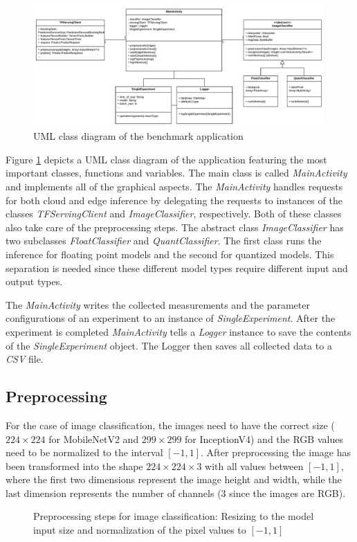 \begin{figure}[htb]
\centering
\includegraphics[width=0.99\textwidth]{./Bilder/UML.pdf}
\caption{UML class diagram of the benchmark application}
\label{fig:UML}
\end{figure}
Figure \ref{fig:UML} depicts a UML class diagram of the application featuring the most important classes, functions and variables. 
The main class is called \emph{MainActivity} and implements all of the graphical aspects. 
The \emph{MainActivity} handles requests for both cloud and edge inference by delegating the requests to instances of the classes \emph{TFServingClient} and \emph{ImageClassifier}, respectively. Both of these classes also take care of the preprocessing steps.
The abstract class \emph{ImageClassifier} has two subclasses \emph{FloatClassifier} and \emph{QuantClassifier}. The first class runs the inference for floating point models and the second for quantized models.
This separation is needed since these different model types require different input and output types.

The \emph{MainActivity} writes the collected measurements and the parameter configurations of an experiment to an instance of \emph{SingleExperiment}. After the experiment is completed \emph{MainActivity} tells a \emph{Logger} instance to save the contents of the \emph{SingleExperiment} object. The Logger then saves all collected data to a \emph{CSV} file.

\subsection{Preprocessing}
For the case of image classification, the images need to have the correct size ($224\times224$ for MobileNetV2 and $299\times299$ for InceptionV4) and the RGB values need to be normalized to the interval $[-1,1]$. After preprocessing the image has been transformed into the shape $224\times224\times3$ with all values between $[-1,1]$, where the first two dimensions represent the image height and width, while the last dimension represents the number of channels (3 since the images are RGB).
\begin{figure}[H]
\centering

\caption{Preprocessing steps for image classification: Resizing to the model input size and normalization of the pixel values to $[-1,1]$}
\label{fig:prepro}
\end{figure}

